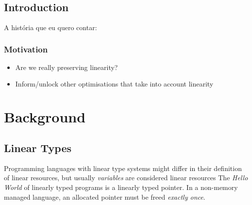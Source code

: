\documentclass[a4paper, draft]{report}
\begin{document}





\section {Introduction}

A história que eu quero contar:

\subsection{Motivation}


\begin{itemize}
    \item Are we really preserving linearity?
    \item Inform/unlock other optimisations that take into account linearity
\end{itemize}

\chapter{Background}

\section{Linear Types\label{linear-types}}

Programming languages with linear type systems might differ in their definition of linear
resources, but usually \emph{variables} are considered linear resources
The \emph{Hello World} of linearly typed programs is a linearly typed pointer.
In a non-memory managed language, an allocated pointer must be freed
\emph{exactly once}. 
\end{document}
